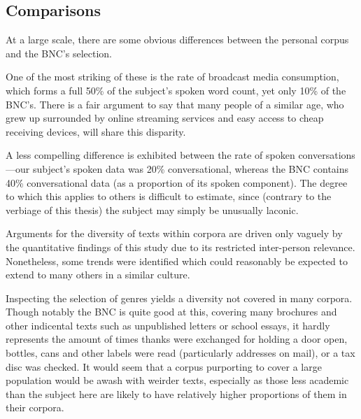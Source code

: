 \subsection{Comparisons}



At a large scale, there are some obvious differences between the personal corpus and the BNC's selection.

One of the most striking of these is the rate of broadcast media consumption, which forms a full 50\% of the subject's spoken word count, yet only 10\% of the BNC's.  There is a fair argument to say that many people of a similar age, who grew up surrounded by online streaming services and easy access to cheap receiving devices, will share this disparity.

A less compelling difference is exhibited between the rate of spoken conversations---our subject's spoken data was 20\% conversational, whereas the BNC contains 40\% conversational data (as a proportion of its spoken component).  The degree to which this applies to others is difficult to estimate, since (contrary to the verbiage of this thesis) the subject may simply be unusually laconic.



Arguments for the diversity of texts within corpora are driven only vaguely by the quantitative findings of this study due to its restricted inter-person relevance.  Nonetheless, some trends were identified which could reasonably be expected to extend to many others in a similar culture.

Inspecting the selection of genres yields a diversity not covered in many corpora.  Though notably the BNC is quite good at this, covering many brochures and other indicental texts such as unpublished letters or school essays, it hardly represents the amount of times thanks were exchanged for holding a door open, bottles, cans and other labels were read (particularly addresses on mail), or a tax disc was checked.  It would seem that a corpus purporting to cover a large population would be awash with weirder texts, especially as those less academic than the subject here are likely to have relatively higher proportions of them in their corpora.

